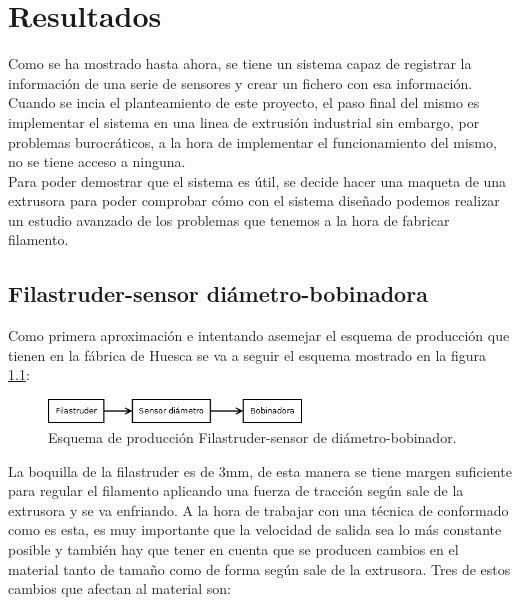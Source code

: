 \chapter{Resultados}
\label{cap:resultados}

Como se ha mostrado hasta ahora, se tiene un sistema capaz de registrar la información de una serie de sensores y crear un fichero con esa información. Cuando se incia el planteamiento de este proyecto, el paso final del mismo es implementar el sistema en una linea de extrusión industrial sin embargo, por problemas burocráticos, a la hora de implementar el funcionamiento del mismo, no se tiene acceso a ninguna. \\

Para poder demostrar que el sistema es útil, se decide hacer una maqueta de una extrusora para poder comprobar cómo con el sistema diseñado podemos realizar un estudio avanzado de los problemas que tenemos a la hora de fabricar filamento.\\


\section{Filastruder-sensor diámetro-bobinadora}
\label{sec:FSB}

Como primera aproximación e intentando asemejar el esquema de producción que tienen en la fábrica de Huesca se va a seguir el esquema mostrado en la figura \ref{fig:esquemap_FSB}:

\begin{figure}[H]
    \centering
    \includegraphics[width=0.6\textwidth]{images/producciones/Diagram1.png}
    \caption[Esquema de producción Filastruder-sensor de diámetro-bobinadora.]{Esquema de producción Filastruder-sensor de diámetro-bobinador.}
    \label{fig:esquemap_FSB}
\end{figure}

La boquilla de la filastruder es de 3mm, de esta manera se tiene margen suficiente para regular el filamento aplicando una fuerza de tracción según sale de la extrusora y se va enfriando. A la hora de trabajar con una técnica de conformado como es esta, es muy importante que la velocidad de salida sea lo más constante posible y también hay que tener en cuenta que se producen cambios en el material tanto de tamaño como de forma según sale de la extrusora. Tres de estos cambios que afectan al material son: \cite{tecno_polimeros}

